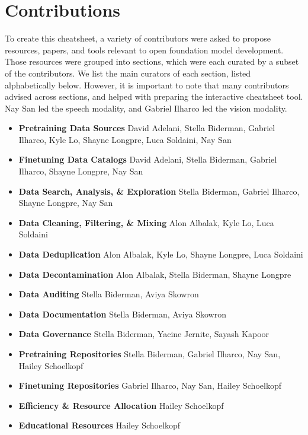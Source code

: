 \section{Contributions}
\label{app:contributions}

To create this cheatsheet, a variety of contributors were asked to propose resources, papers, and tools relevant to open foundation model development.
Those resources were grouped into sections, which were each curated by a subset of the contributors.
We list the main curators of each section, listed alphabetically below.
However, it is important to note that many contributors advised across sections, and helped with preparing the interactive cheatsheet tool.
Nay San led the speech modality, and Gabriel Ilharco led the vision modality.

\begin{itemize}
    \item \textbf{Pretraining Data Sources} \; David Adelani, Stella Biderman, Gabriel Ilharco, Kyle Lo, Shayne Longpre, Luca Soldaini, Nay San
    \item \textbf{Finetuning Data Catalogs} \; David Adelani, Stella Biderman, Gabriel Ilharco, Shayne Longpre, Nay San
    \item \textbf{Data Search, Analysis, \& Exploration} \; Stella Biderman, Gabriel Ilharco, Shayne Longpre, Nay San
    \item \textbf{Data Cleaning, Filtering, \& Mixing} \; Alon Albalak, Kyle Lo, Luca Soldaini
    \item \textbf{Data Deduplication} \; Alon Albalak, Kyle Lo, Shayne Longpre, Luca Soldaini
    \item \textbf{Data Decontamination} \; Alon Albalak, Stella Biderman, Shayne Longpre
    \item \textbf{Data Auditing} \; Stella Biderman, Aviya Skowron
    \item \textbf{Data Documentation} \; Stella Biderman, Aviya Skowron
    \item \textbf{Data Governance} \; Stella Biderman, Yacine Jernite, Sayash Kapoor
    \item \textbf{Pretraining Repositories} \; Stella Biderman, Gabriel Ilharco, Nay San, Hailey Schoelkopf
    \item \textbf{Finetuning Repositories} \; Gabriel Ilharco, Nay San, Hailey Schoelkopf
    \item \textbf{Efficiency \& Resource Allocation} \; Hailey Schoelkopf
    \item \textbf{Educational Resources} \; Hailey Schoelkopf

\end{itemize}
